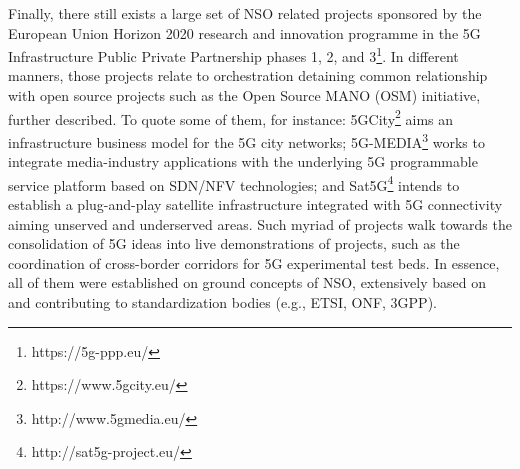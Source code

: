 Finally, there still exists a large set of NSO related projects sponsored by the European Union Horizon 2020 research and innovation programme in the 5G Infrastructure Public Private Partnership phases 1, 2, and 3\footnote{https://5g-ppp.eu/}.
In different manners, those projects relate to orchestration detaining common relationship with open source projects such as the Open Source MANO (OSM) initiative, further described.
To quote some of them, for instance: 5GCity\footnote{https://www.5gcity.eu/} aims an infrastructure business model for the 5G city networks; 5G-MEDIA\footnote{http://www.5gmedia.eu/} works to integrate media-industry applications with the underlying 5G programmable service platform based on SDN/NFV technologies; and Sat5G\footnote{http://sat5g-project.eu/} intends to establish a plug-and-play satellite infrastructure integrated with 5G connectivity aiming unserved and underserved areas.
Such myriad of projects walk towards the consolidation of 5G ideas into live demonstrations of projects, such as the coordination of cross-border corridors for 5G experimental test beds.
In essence, all of them were established on ground concepts of NSO, extensively based on and contributing to standardization bodies (e.g., ETSI, ONF, 3GPP).